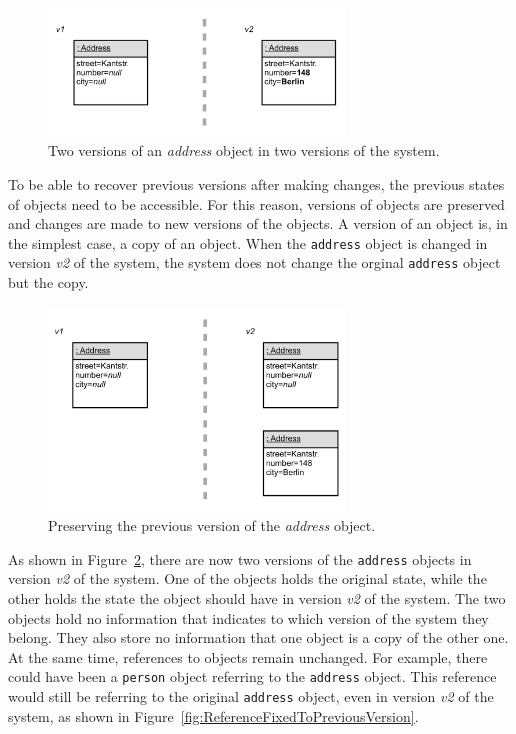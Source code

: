 \begin{figure}[h]
    \centering
    \includegraphics[width=0.7\textwidth]{figures/4_approach/2_objectChange.pdf}
    \caption{Two versions of an \emph{address} object in two versions of the system.}
    \label{fig:ObjectChanged}
\end{figure}

To be able to recover previous versions after making changes, the previous states of objects need to be accessible.
For this reason, versions of objects are preserved and changes are made to new versions of the objects.
A version of an object is, in the simplest case, a copy of an object.
When the \lstinline{address} object is changed in version \emph{v2} of the system, the system does not change the orginal \lstinline{address} object but the copy.

\begin{figure}[h!]
    \centering
    \includegraphics[width=0.7\textwidth]{figures/4_approach/3_previousVersionPreserved.pdf}
    \caption{Preserving the previous version of the \emph{address} object.}
    \label{fig:VersionPreserved}
\end{figure}

As shown in Figure~\ref{fig:VersionPreserved}, there are now two versions of the \lstinline{address} objects in version \emph{v2} of the system.
One of the objects holds the original state, while the other holds the state the object should have in version \emph{v2} of the system.
The two objects hold no information that indicates to which version of the system they belong.
They also store no information that one object is a copy of the other one.
At the same time, references to objects remain unchanged.
For example, there could have been a \lstinline{person} object referring to the \lstinline{address} object.
This reference would still be referring to the original \lstinline{address} object, even in version \emph{v2} of the system, as shown in Figure~\ref{fig:ReferenceFixedToPreviousVersion}.

